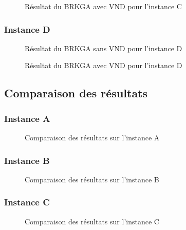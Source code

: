                 \begin{figure}[H]
                	
                \caption{Résultat du BRKGA avec VND pour l'instance C}
				\label{fig:30m4i3d-avecvnd}
				\end{figure}
				
            \subsubsection{Instance D}
            	\begin{figure}[H]
                	
                \caption{Résultat du BRKGA sans VND pour l'instance D}
				\label{fig:40m5i4d-sansvnd}
                \end{figure}
                
                \begin{figure}[H]
                	
                \caption{Résultat du BRKGA avec VND pour l'instance D}
				\label{fig:40m5i4d-avecvnd}
				\end{figure}

        \subsection{Comparaison des résultats}
        \label{subs:comparison}

            \subsubsection{Instance A}
                \begin{figure}[H]
                    
                    \caption{Comparaison des résultats sur l'instance A}
                    \label{fig:10m2i2d-comp}
                \end{figure}

            \subsubsection{Instance B}
                \begin{figure}[H]
                    
                    \caption{Comparaison des résultats sur l'instance B}
                    \label{fig:20m3i3d-comp}
                \end{figure}

            \subsubsection{Instance C}
                \begin{figure}[H]
                    
                    \caption{Comparaison des résultats sur l'instance C}
                    \label{fig:30m4i3d-comp}
                \end{figure}

